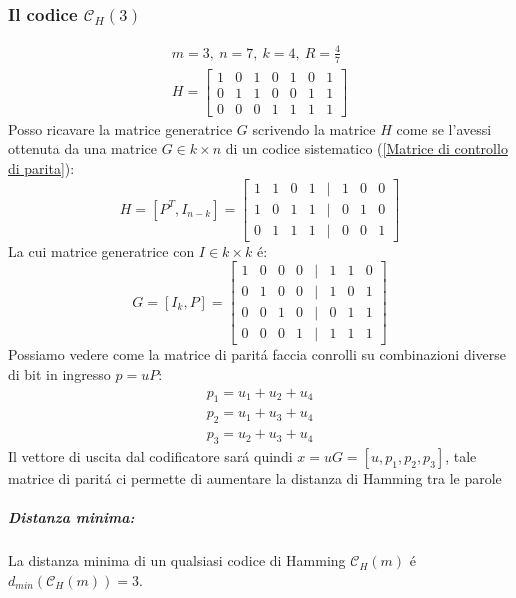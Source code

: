         \subsubsection{Il codice $\mathcal{C}_H(3)$}
        \begin{gather}
            m=3,\ n=7,\ k=4,\ R=\frac{4}{7} \nonumber \\
            H = \begin{bmatrix}
                1 & 0 & 1 & 0 & 1 & 0 & 1\\
                0 & 1 & 1 & 0 & 0 & 1 & 1\\
                0 & 0 & 0 & 1 & 1 & 1 & 1
            \end{bmatrix}  \nonumber
        \end{gather}
        Posso ricavare la matrice generatrice $G$ scrivendo la matrice $H$ come se l'avessi ottenuta da una matrice $G\in k \times n$ di un codice sistematico (\ref{Matrice di controllo di parita}):
        \[
            H = [P^T,I_{n-k}] =\begin{bmatrix}
                                 1  & 1 & 0 & 1 & | & 1  & 0 & 0\\
                                 1  & 0 & 1 & 1 & | & 0  & 1 & 0\\
                                 0  & 1 & 1 & 1 & | & 0  & 0 & 1
                            \end{bmatrix} 
        \]
        La cui matrice generatrice con $I \in k \times k$ é:
        \[
            G = [I_{k},P] =\begin{bmatrix}
                                 1  & 0 & 0 & 0 & | & 1  & 1 & 0\\
                                 0  & 1 & 0 & 0 & | & 1  & 0 & 1\\
                                 0  & 0 & 1 & 0 & | & 0  & 1 & 1\\
                                 0  & 0 & 0 & 1 & | & 1  & 1 & 1
                            \end{bmatrix} 
        \]
        Possiamo vedere come la matrice di paritá faccia conrolli su combinazioni diverse di bit in ingresso $p = uP$:
        \begin{gather}
            p_1 = u_1+u_2+u_4 \nonumber\\
            p_2 = u_1+u_3+u_4 \nonumber\\
            p_3 = u_2+u_3+u_4 \nonumber
        \end{gather}
        Il vettore di uscita dal codificatore sará quindi $x = uG = [u,p_1,p_2,p_3]$, tale matrice di paritá ci permette di aumentare la distanza di Hamming
        tra le parole
        \subparagraph{Distanza minima:} La distanza minima di un qualsiasi codice di Hamming $\mathcal{C}_H(m)$ é $d_{min}(\mathcal{C}_H(m)) = 3$.


